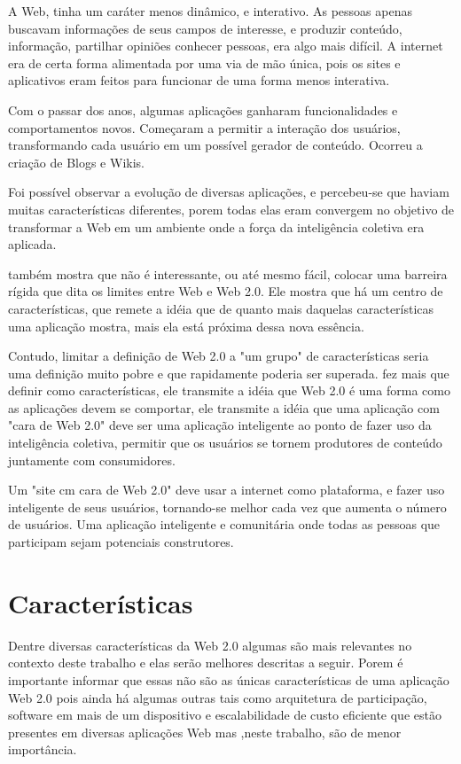 \documentclass[
	12pt,				%
	openright,			%
	twoside,			%
	a4paper,			%
	Times,
	brazil,				%
	]{abntex2}
\begin{document}
A Web, tinha um caráter menos dinâmico, e interativo. As pessoas apenas buscavam informações de seus campos de interesse, e produzir conteúdo, informação, partilhar opiniões conhecer pessoas, era algo mais difícil. A internet era de certa forma alimentada por uma via de mão única, pois os sites e aplicativos eram feitos para funcionar de uma forma menos interativa. \cite{web2.0}
\par

Com o passar dos anos, algumas aplicações ganharam funcionalidades e comportamentos novos. Começaram a permitir a interação dos usuários, transformando cada usuário em um possível gerador de conteúdo. Ocorreu a criação de Blogs e Wikis.\cite{web2.0}

Foi possível observar a evolução de diversas aplicações, e percebeu-se que haviam muitas características diferentes, porem todas elas eram convergem no objetivo de transformar a Web em um ambiente onde a força da inteligência coletiva era aplicada.\cite{web2.0}

 também mostra que não é interessante, ou até mesmo fácil, colocar uma barreira rígida que dita os limites entre Web e Web 2.0. Ele mostra que há um centro de características, que remete a idéia que de quanto mais daquelas características uma aplicação mostra, mais ela está próxima dessa nova essência. 
\par

Contudo, limitar a definição de Web 2.0 a "um grupo" de características seria uma definição muito pobre e que rapidamente poderia ser superada.  fez mais que definir como características, ele transmite a idéia que Web 2.0 é uma forma como as aplicações devem se comportar, ele transmite a idéia que uma aplicação com "cara de Web 2.0" deve ser uma aplicação inteligente ao ponto de fazer uso da inteligência coletiva, permitir que os usuários se tornem produtores de conteúdo juntamente com consumidores.

Um "site cm cara de Web 2.0" deve usar a internet como plataforma, e fazer uso inteligente de seus usuários, tornando-se melhor cada vez que aumenta o número de usuários. Uma aplicação inteligente e comunitária onde todas as pessoas que participam sejam potenciais construtores.  \cite{web2.0}

\section{Características}
Dentre diversas características da Web 2.0 algumas são mais relevantes no contexto deste trabalho e elas serão melhores descritas a seguir. Porem é importante informar que essas não são as únicas características de uma aplicação Web 2.0 pois ainda há algumas outras tais como arquitetura de participação, software em mais de um dispositivo e escalabilidade de custo eficiente que estão presentes em diversas aplicações Web mas ,neste trabalho, são de menor importância. \cite{web2.0}
\end{document}
